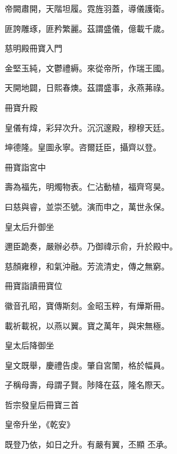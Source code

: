 \begin{pinyinscope}
 帝闕肅開，天階坦履。霓旌羽蓋，導儀護衛。



 匪誇雕琢，匪矜繁麗。茲謂盛儀，億載千歲。



 慈明殿冊寶入門



 金堅玉純，文鬱禮縟。來從帝所，作瑞王國。



 天開地闢，日熙春燠。茲謂盛事，永燕茀祿。



 冊寶升殿



 皇儀有煒，彩舁次升。沉沉邃殿，穆穆天廷。



 坤德隆。皇圖永寧。咨爾廷臣，攝齊以登。



 冊寶詣宮中



 壽為福先，明燭物表。仁沾動植，福齊穹昊。



 曰慈與睿，並崇丕號。演而申之，萬世永保。



 皇太后升御坐



 邇臣跪奏，嚴辦必恭。乃御禕示俞，升於殿中。



 慈顏雍穆，和氣沖融。芳流清史，傳之無窮。



 冊寶詣讀冊寶位



 徽音孔昭，寶傳斯刻。金昭玉粹，有燁斯冊。



 載祈載祝，以燕以翼。寶之萬年，與宋無極。



 皇太后降御坐



 皇文既舉，慶禮告虔。肇自宮闈，格於幅員。



 子稱母壽，母謂子賢。陟降在茲，隆名際天。



 哲宗發皇后冊寶三首



 皇帝升坐，《乾安》



 既登乃依，如日之升。有嚴有翼，丕顯
 丕承。




\end{pinyinscope}
